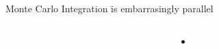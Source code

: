 \autobookmark
\begin{frame}[t]{Monte Carlo Integration is embarrasingly parallel}
  \begin{columns}[T]
    \begin{column}{.5\textwidth}
    \end{column}
    \begin{column}{.5\textwidth}
      \begin{itemize}
        \item
      \end{itemize}
    \end{column}
  \end{columns}
\end{frame}
